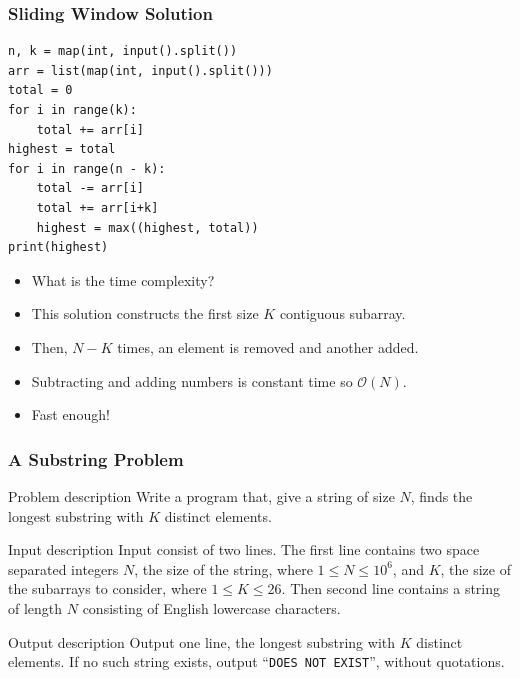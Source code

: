 \documentclass{beamer}
\begin{document}
\begin{frame}
    \frametitle{Sliding Window Solution}
	\begin{scriptsize}
        \begin{verbatim}
n, k = map(int, input().split())
arr = list(map(int, input().split()))
total = 0
for i in range(k):
    total += arr[i]
highest = total
for i in range(n - k):
    total -= arr[i]
    total += arr[i+k]
    highest = max((highest, total))
print(highest)
        \end{verbatim}
    \end{scriptsize}
    \begin{itemize}
        \item<2-> What is the time complexity?
        \item<3-> This solution constructs the first size $K$ contiguous subarray.
        \item<4-> Then, $N-K$ times, an element is removed and another added.
        \item<5-> Subtracting and adding numbers is constant time so $\mathcal{O}(N)$.
        \item<6-> Fast enough!
    \end{itemize}
\end{frame}

\begin{frame}[plain]
	\frametitle{A Substring Problem}
	\begin{block}{Problem description}
    	    Write a program that, give a string of size $N$, finds the
            longest substring with $K$ distinct elements.
    \end{block}

    \vspace{10pt}
    
    \begin{block}{Input description}
            Input consist of two lines.
            The first line contains two space separated integers $N$, the size of the string, where $1 \leq N \leq 10^6$,
    and $K$, the size of the subarrays to consider, where $1 \leq K \leq 26$.
            Then second line contains a string of length $N$ consisting of English lowercase characters.
    \end{block}

    \vspace{10pt}
    
    \begin{block}{Output description}
            Output one line, the longest substring with $K$ distinct elements.
            If no such string exists, output ``\texttt{DOES NOT EXIST}'', without quotations.
    \end{block}
\end{frame}
\end{document}
